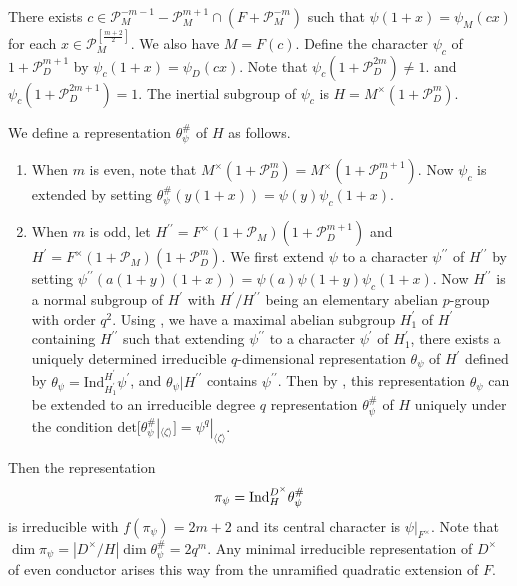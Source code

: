 \documentclass[12pt]{amsart}
\theoremstyle{definition}
\theoremstyle{remark}
\begin{document}
There exists $c \in  \mathcal P_M^{-m-1} - \mathcal P_M^{m+1} \cap (F + \mathcal P_M^{-m})$ such that $\psi(1 + x)= \psi_M(cx)$ for each $x \in \mathcal P_M^{[\frac{m+2}{2}]}$. We also have $M=F(c)$. Define the character $\psi_c$ of $1+\mathcal P_D^{m+1}$ by $\psi_c(1+x) = \psi_D(cx)$. Note that $\psi_c(1+\mathcal P_D^{2m}) \neq 1$. and $\psi_c(1+\mathcal P_D^{2m+1}) = 1$.  The inertial subgroup of $\psi_c$ is $H = M^\times(1+\mathcal P_D^m)$.

We define a representation $\theta_\psi^\#$ of $H$ as follows.
\begin{enumerate}
\item
When $m$ is even, note that $M^\times (1 + \mathcal P_D^m) = M^\times (1 + \mathcal P_D^{m+1})$. Now $\psi_c$ is extended by setting  $\theta_\psi^\#(y(1+x)) = \psi(y) \psi_c(1+x)$. 
\item
When $m$ is odd, let $H^{\prime \prime} = F^\times (1 +\mathcal P_M) ( 1 + \mathcal P_D^{m+1})$ and $H^\prime = F^\times (1 +\mathcal P_M) ( 1 + \mathcal P_D^m)$. We first extend $\psi$ to a character $\psi^{\prime \prime}$ of $H^{\prime \prime}$ by setting $\psi^{\prime \prime}(a(1+y)(1 + x)) = \psi (a) \psi(1+y) \psi_c(1+x)$. Now $H^{\prime \prime}$ is a normal subgroup of $H^\prime$ with $H^\prime/H^{\prime \prime}$ being an elementary abelian $p$-group with order $q^2$. Using \cite[Proposition 8.3.3]{bf83}, we have a maximal abelian subgroup $H^\prime_1$ of $H^\prime$ containing $H^{\prime \prime}$ such that extending $\psi^{\prime \prime}$ to a character $\psi^\prime$ of $H^\prime_1$, there exists a uniquely determined irreducible $q$-dimensional representation $\theta_\psi$ of $H^\prime$ defined by $\theta_\psi = \mathrm{Ind}^{H^\prime}_{H_1^\prime} \psi^\prime$, and $\theta_\psi|{H^{\prime \prime}}$ contains $\psi^{\prime \prime}$. Then by \cite[Proposition 8.4.1]{bf83}, this representation $\theta_\psi$ can be extended to an irreducible degree $q$ representation $\theta_\psi^\#$ of $H$ uniquely under the condition  $\mathrm{det}[\theta_\psi^\#|_{\langle \zeta \rangle}]= \psi^q|_{\langle \zeta \rangle}$.
\end{enumerate}

Then the representation \[\pi_\psi = {\rm Ind}^{D^\times}_{H} \theta_\psi^\# \]
is irreducible with $f(\pi_\psi) = 2m+2$ and its central character is $\psi|_{F^\times}$. Note that $\dim \pi_\psi = |D^\times/H| \dim \theta_\psi^\#= 2q^m$. Any minimal irreducible representation of $D^\times$ of even conductor arises this way from the unramified quadratic extension of $F$.
\end{document}
